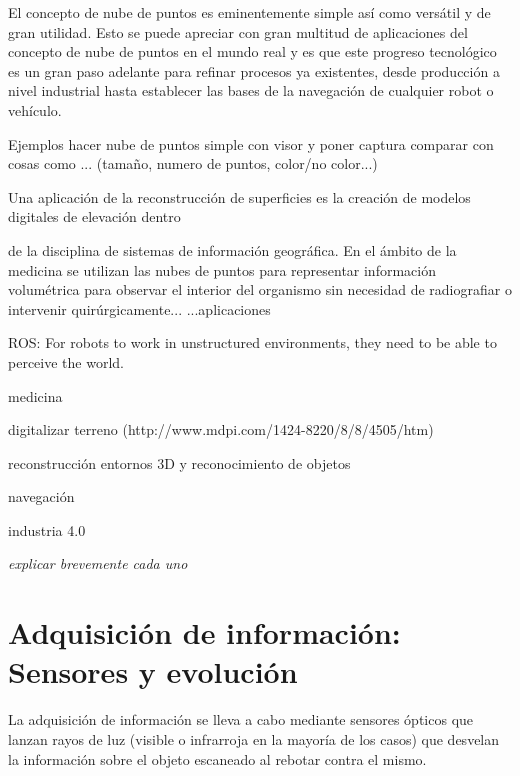 El concepto de nube de puntos es eminentemente simple así como versátil y de gran utilidad. Esto se puede apreciar con gran multitud de aplicaciones del concepto de nube de puntos en el mundo real y es que este progreso tecnológico es un gran paso adelante para refinar procesos ya existentes, desde producción a nivel industrial hasta establecer las bases de la navegación de cualquier robot o vehículo.

Ejemplos
hacer nube de puntos simple con visor y poner captura
comparar con cosas como ... (tamaño, numero de puntos, color/no color...)


Una aplicación de la reconstrucción de superficies es la creación de modelos digitales de elevación dentro

de la disciplina de sistemas de información geográfica.
En el ámbito de la medicina se utilizan las nubes de puntos para representar información volumétrica para
observar el interior del organismo sin necesidad de radiografiar o intervenir quirúrgicamente...
...aplicaciones

\begin{list}{-}
\item ROS: For robots to work in unstructured environments, they need
to be able to perceive the world.
\item medicina %
\item digitalizar terreno (http://www.mdpi.com/1424-8220/8/8/4505/htm)
\item reconstrucción entornos 3D y reconocimiento de objetos
\item navegación %
\item industria 4.0
\end{list}

\textit{explicar brevemente cada uno}





\section{Adquisición de información: Sensores y evolución}

La adquisición de información se lleva a cabo mediante sensores ópticos que lanzan rayos de luz (visible
o infrarroja en la mayoría de los casos) que desvelan la información sobre el objeto escaneado al rebotar
contra el mismo.

